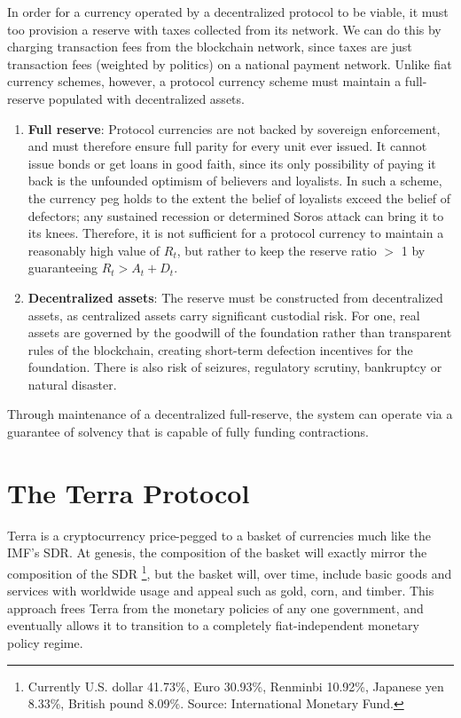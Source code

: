 \documentclass{article}
\begin{document}
In order for a currency operated by a decentralized protocol to be viable, it must too provision a reserve with taxes collected from its network. We can do this by charging transaction fees from the blockchain network, since taxes are just transaction fees (weighted by politics) on a national payment network. Unlike fiat currency schemes, however, a protocol currency scheme must maintain a full-reserve populated with decentralized assets. 

\begin{enumerate}
    \item \textbf{Full reserve}: Protocol currencies are not backed by sovereign enforcement, and must therefore ensure full parity for every unit ever issued. It cannot issue bonds or get loans in good faith, since its only possibility of paying it back is the unfounded optimism of believers and loyalists. In such a scheme, the currency peg holds to the extent the belief of loyalists exceed the belief of defectors; any sustained recession or determined Soros attack can bring it to its knees. Therefore, it is not sufficient for a protocol currency to maintain a reasonably high value of $R_t$, but rather to keep the reserve ratio $>$ 1 by guaranteeing $R_t > A_t + D_t$. 
    
    \item \textbf{Decentralized assets}: The reserve must be constructed from decentralized assets, as centralized assets carry significant custodial risk. For one, real assets are governed by the goodwill of the foundation rather than transparent rules of the blockchain, creating short-term defection incentives for the foundation. There is also risk of seizures, regulatory scrutiny, bankruptcy or natural disaster.
\end{enumerate}

Through maintenance of a decentralized full-reserve, the system can operate via a guarantee of solvency that is capable of fully funding contractions. 


\section{The Terra Protocol}

Terra is a cryptocurrency price-pegged to a basket of currencies much like the IMF's SDR. At genesis, the composition of the basket will exactly mirror the composition of the SDR \footnote{Currently  U.S. dollar 41.73\%, Euro 30.93\%, Renminbi 10.92\%, Japanese yen 8.33\%, British pound 8.09\%. Source: International Monetary Fund.}, but the basket will, over time, include basic goods and services with worldwide usage and appeal such as gold, corn, and timber. This approach frees Terra from the monetary policies of any one government, and eventually allows it to transition to a completely fiat-independent monetary policy regime. 
\end{document}
